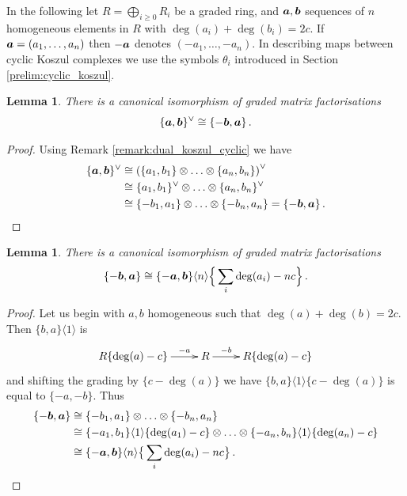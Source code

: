\documentclass{compositio}
\newtheorem{lemma}[theorem]{Lemma}
\theoremstyle{definition}
\numberwithin{equation}{section}
\begin{document}
In the following let $R = \bigoplus_{i \ge 0} R_i$ be a graded ring, and $\boldsymbol{a}, \boldsymbol{b}$ sequences of $n$ homogeneous elements in $R$ with $\deg(a_i) + \deg(b_i) = 2c$. If $\boldsymbol{a} = (a_1,\ldots,a_n)$ then $- \boldsymbol{a}$ denotes $(-a_1, \ldots, -a_n)$. In describing maps between cyclic Koszul complexes we use the symbols $\theta_i$ introduced in Section \ref{prelim:cyclic_koszul}.

\begin{lemma}\label{lemma:cyclickos1} There is a canonical isomorphism of graded matrix factorisations
\[
\{ \boldsymbol{a}, \boldsymbol{b} \}^{\vee} \cong \{ -\boldsymbol{b}, \boldsymbol{a} \} \, .
\]
\end{lemma}
\begin{proof}
Using Remark \ref{remark:dual_koszul_cyclic} we have
\begin{align*}
\{ \boldsymbol{a}, \boldsymbol{b} \}^{\vee} &\cong \left( \{ a_1, b_1 \} \otimes \ldots \otimes \{ a_n, b_n \} \right)^{\vee}\\
&\cong \{ a_1, b_1 \}^{\vee} \otimes \ldots \otimes \{ a_n, b_n \}^{\vee}\\
&\cong \{ -b_1, a_1 \} \otimes \ldots \otimes \{ -b_n, a_n \} = \{ - \boldsymbol{b}, \boldsymbol{a} \} \, .
\end{align*}
\end{proof}

\begin{lemma}\label{lemma:cyclickos2} There is a canonical isomorphism of graded matrix factorisations
\begin{equation}
\label{abba}
\{ - \boldsymbol{b}, \boldsymbol{a} \} \cong \{ -\boldsymbol{a}, \boldsymbol{b} \}\langle n \rangle \Big\{ \sum_i \deg(a_i) - nc \Big\} \, .
\end{equation}
\end{lemma}
\begin{proof}
Let us begin with $a,b$ homogeneous such that $\deg(a) + \deg(b) = 2c$. Then $\{ b, a \}\langle 1 \rangle$ is
\[
\xymatrix{
R\{ \deg(a) - c \} \ar[r]^-{-a} & R \ar[r]^-{-b} & R\{ \deg(a) - c \}
}
\]
and shifting the grading by $\{ c - \deg(a) \}$ we have $\{ b, a \}\langle 1 \rangle\{ c - \deg(a) \}$ is equal to $\{ -a, -b \}$. Thus
\begin{align*}
\{ - \boldsymbol{b}, \boldsymbol{a} \} &\cong \{ -b_1, a_1 \} \otimes \ldots \otimes \{ -b_n, a_n \}\\
&\cong \{ -a_1, b_1 \}\langle 1 \rangle\{ \deg(a_1) - c \} \otimes \ldots \otimes \{ -a_n, b_n \}\langle 1 \rangle\{ \deg(a_n) - c \}\\
&\cong \{ -\boldsymbol{a}, \boldsymbol{b} \}\langle n \rangle\big\{ \sum_i \deg(a_i) - nc \big\} \, .
\end{align*}
\end{proof}
\end{document}
